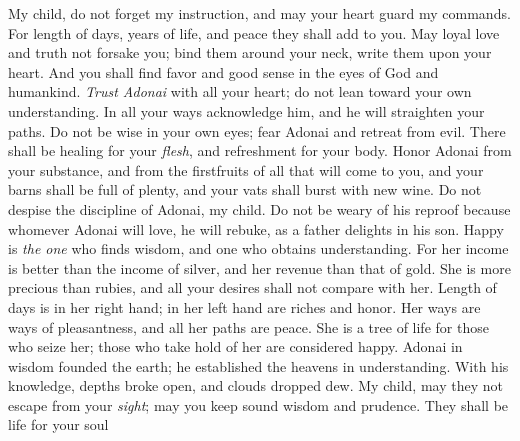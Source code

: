 \begin{biblechapter} %
 My child, do not forget my instruction, 
and may your heart guard my commands.
\verse For length of days, years of life, 
and peace they shall add to you.
\verse May loyal love and truth not forsake you; 
bind them around your neck, 
write them upon your heart.
\verse And you shall find favor and good sense 
in the eyes of God and humankind.
\verse \textit{Trust Adonai} with all your heart; 
do not lean toward your own understanding.
\verse In all your ways acknowledge him, 
and he will straighten your paths.
\verse Do not be wise in your own eyes; 
fear Adonai and retreat from evil.
\verse There shall be healing for your \textit{flesh}, 
and refreshment for your body.
\verse Honor Adonai from your substance, 
and from the firstfruits of all that will come to you,
\verse and your barns shall be full of plenty, 
and your vats shall burst with new wine.
 Do not despise the discipline of Adonai, my child. 
Do not be weary of his reproof
\verse because whomever Adonai will love, he will rebuke, 
as a father delights in his son.
\verse Happy is \textit{the one} who finds wisdom, 
and one who obtains understanding.
\verse For her income is better than the income of silver, 
and her revenue than that of gold.
\verse She is more precious than rubies, 
and all your desires shall not compare with her.
\verse Length of days is in her right hand; 
in her left hand are riches and honor.
\verse Her ways are ways of pleasantness, 
and all her paths are peace.
\verse She is a tree of life for those who seize her; 
those who take hold of her are considered happy.
 Adonai in wisdom founded the earth; 
he established the heavens in understanding.
\verse With his knowledge, depths broke open, 
and clouds dropped dew.
\verse My child, may they not escape from your \textit{sight}; 
may you keep sound wisdom and prudence.
\verse They shall be life for your soul 

\end{biblechapter}
